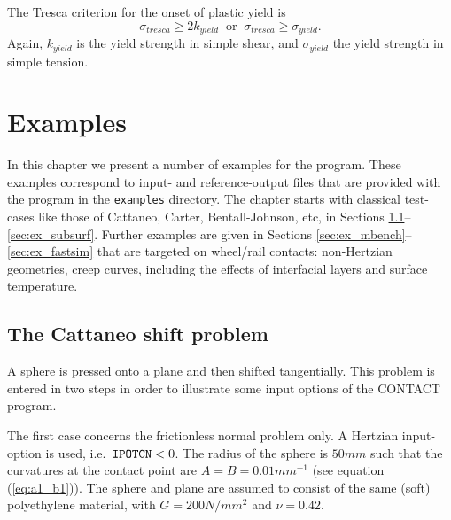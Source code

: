 \documentclass[12pt]{report}
\begin{document}
The Tresca criterion for the onset of plastic yield is
\begin{equation}\label{eq:tresca}
   \sigma_{tresca} \ge 2 k_{yield} \;\;\mbox{or}\;\; 
   \sigma_{tresca}\ge \sigma_{yield} .
\end{equation}
Again, $k_{yield}$ is the yield strength in simple shear, and
$\sigma_{yield}$ the yield strength in simple tension.


\chapter{Examples}
\label{chp:examples}

In this chapter we present a number of examples for the program. These
examples correspond to input- and reference-output files that are provided
with the program in the {\tt examples} directory. The chapter starts with
classical test-cases like those of Cattaneo, Carter, Bentall-Johnson, etc,
in Sections \ref{sec:ex_cattaneo}--\ref{sec:ex_subsurf}. Further examples
are given in Sections \ref{sec:ex_mbench}--\ref{sec:ex_fastsim} that are
targeted on wheel/rail contacts: non-Hertzian geometries, creep
curves, including the effects of interfacial layers and surface
temperature.

\section{The Cattaneo shift problem}
\label{sec:ex_cattaneo}

A sphere is pressed onto a plane and then shifted tangentially. This problem
is entered in two steps in order to illustrate some input options of the
CONTACT program.

The first case concerns the frictionless normal problem only. A Hertzian
input-option is used, i.e.\ ${\tt IPOT\-CN}<0$. The radius of the sphere is
$50\unit{mm}$ such that the curvatures at the contact point are $A=B=
0.01\unit{mm^{-1}}$ (see equation (\ref{eq:a1_b1})). The sphere and plane are
assumed to consist of the same (soft) polyethylene material, with
$G=200\unit{N/mm^2}$ and $\nu=0.42$.
\end{document}
